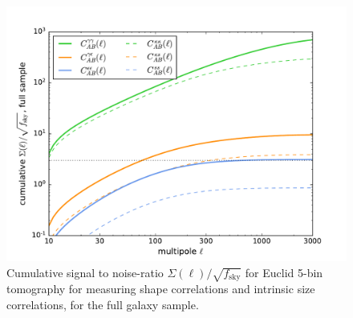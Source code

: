 \documentclass[a4paper,fleqn,usenatbib]{mnras}
\begin{document}
\begin{figure}
\centering
\includegraphics[scale=0.45]{./figures/sigma_all.pdf}
\caption{Cumulative signal to noise-ratio $\Sigma(\ell)/\sqrt{f_\mathrm{sky}}$ for Euclid 5-bin tomography for measuring shape correlations and intrinsic size correlations, for the full galaxy sample.}
\label{fig:s2n_all}
\end{figure}
\end{document}
